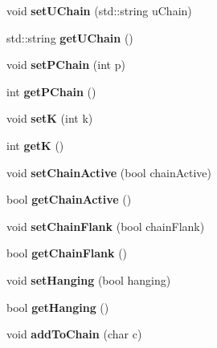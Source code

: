 \begin{DoxyCompactItemize}
void {\bfseries set\+U\+Chain} (std\+::string u\+Chain)
\item 
\mbox{\label{classdspSystem_ae1c2b48051dbae840835ad0ee56967a7}} 
std\+::string {\bfseries get\+U\+Chain} ()
\item 
\mbox{\label{classdspSystem_ad35a56445e965fa36164e50ec293f3b9}} 
void {\bfseries set\+P\+Chain} (int p)
\item 
\mbox{\label{classdspSystem_a1648a891039be5c5736e84107575962b}} 
int {\bfseries get\+P\+Chain} ()
\item 
\mbox{\label{classdspSystem_a6ad1ac88e48cc094514c24097647603b}} 
void {\bfseries setK} (int k)
\item 
\mbox{\label{classdspSystem_a4835208b31e42169cd7c77dfd5ff8719}} 
int {\bfseries getK} ()
\item 
\mbox{\label{classdspSystem_a1454ebbe7ae9a4dfc6332ffdc9d5cf30}} 
void {\bfseries set\+Chain\+Active} (bool chain\+Active)
\item 
\mbox{\label{classdspSystem_ab9ddb9d445f241fe6b93d78fe4dc25a1}} 
bool {\bfseries get\+Chain\+Active} ()
\item 
\mbox{\label{classdspSystem_a2779a1a4d89227eeeaf413546251ad87}} 
void {\bfseries set\+Chain\+Flank} (bool chain\+Flank)
\item 
\mbox{\label{classdspSystem_a49e91aba4edaf30f4927ef86275dd322}} 
bool {\bfseries get\+Chain\+Flank} ()
\item 
\mbox{\label{classdspSystem_ace2555f892e00f90d97225f4155f543f}} 
void {\bfseries set\+Hanging} (bool hanging)
\item 
\mbox{\label{classdspSystem_a803859000096fdb1dd9efecf1d2f51f4}} 
bool {\bfseries get\+Hanging} ()
\item 
\mbox{\label{classdspSystem_a891237b8714b300abf9a207c588f9978}} 
void {\bfseries add\+To\+Chain} (char c)
\end{DoxyCompactItemize}
